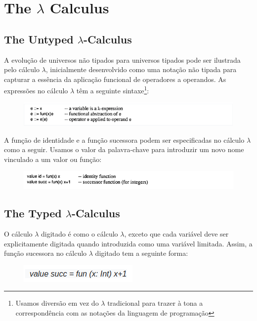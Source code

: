 \section{The $\lambda$ Calculus}

\subsection{The Untyped $\lambda$-Calculus}
A evolução de universos não tipados para universos tipados pode ser ilustrada pelo cálculo $\lambda$, inicialmente desenvolvido como uma notação não tipada para capturar a essência da aplicação funcional de operadores a operandos.
As expressões no cálculo $\lambda$ têm a seguinte sintaxe\footnote{Usamos diversão em vez do $\lambda$ tradicional para trazer à tona a correspondência com as notações da linguagem de programação}:
\begin{figure}[h]
    \centering %
    \includegraphics[]{anexos/Screenshot_40.png}
\end{figure}
\par A função de identidade e a função sucessora podem ser especificadas no cálculo $\lambda$ como a seguir.
Usamos o valor da palavra-chave para introduzir um novo nome vinculado a um valor ou função:
\begin{figure}[h]
    \centering %
    \includegraphics[]{anexos/Screenshot_39.png}
\end{figure}

\subsection{The Typed $\lambda$-Calculus}
O cálculo $\lambda$ digitado é como o cálculo $\lambda$, exceto que cada variável deve ser explicitamente digitada quando introduzida como uma variável limitada.
Assim, a função sucessora no cálculo $\lambda$ digitado tem a seguinte forma:
\pagebreak
\begin{figure}[h]
    \centering %
    \includegraphics[]{anexos/Screenshot_41.png}
\end{figure}
